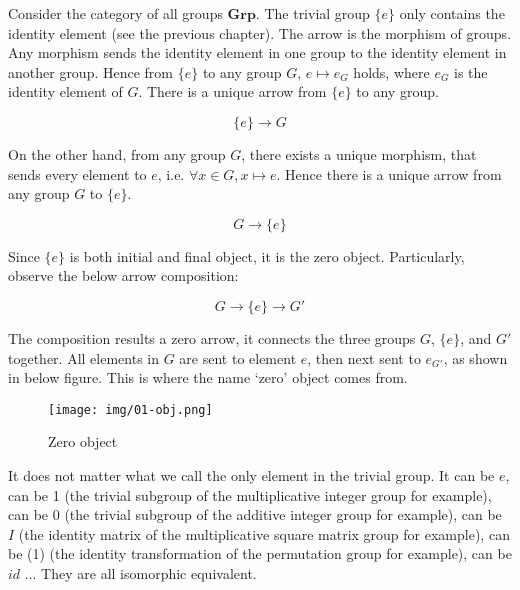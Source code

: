 \documentclass{article}
\begin{document}
\begin{example}
\normalfont
Consider the category of all groups $\pmb{Grp}$. The trivial group $\{e\}$ only contains the identity element (see the previous chapter). The arrow is the morphism of groups. Any morphism sends the identity element in one group to the identity element in another group. Hence from $\{e\}$ to any group $G$, $e \mapsto e_G$ holds, where $e_G$ is the identity element of $G$. There is a unique arrow from $\{e\}$ to any group.

\[
\{e\} \longrightarrow G
\]

On the other hand, from any group $G$, there exists a unique morphism, that sends every element to $e$, i.e. $\forall x \in G, x \mapsto e$. Hence there is a unique arrow from any group $G$ to $\{e\}$.

\[
G \longrightarrow \{e\}
\]

Since $\{e\}$ is both initial and final object, it is the zero object. Particularly, observe the below arrow composition:

\[
  G \longrightarrow \{e\} \longrightarrow G'
\]

The composition results a zero arrow, it connects the three groups $G$, $\{e\}$, and $G'$ together. All elements in $G$ are sent to element $e$, then next sent to $e_{G'}$, as shown in below figure. This is where the name `zero' object comes from.

\begin{figure}[htbp]
 \centering
 \texttt{[image: img/01-obj.png]}
 \caption{Zero object}
 \label{fig:zero-obj}
\end{figure}

It does not matter what we call the only element in the trivial group. It can be $e$, can be 1 (the trivial subgroup of the multiplicative integer group for example), can be 0 (the trivial subgroup of the additive integer group for example), can be $I$ (the identity matrix of the multiplicative square matrix group for example), can be (1) (the identity transformation of the permutation group for example), can be $id$ ... They are all isomorphic equivalent.
\end{example}
\end{document}
